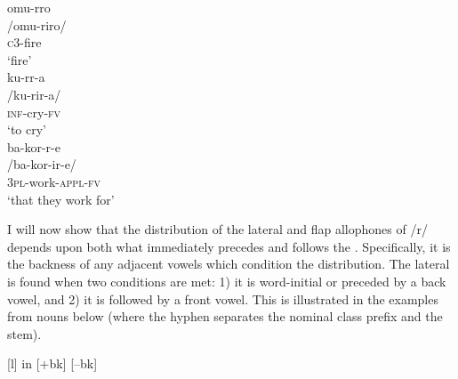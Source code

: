 \documentclass[output=paper,modfonts,nonflat,
colorlinks, citecolor=brown,
draftmode,
]{langsci/langscibook}
\begin{document}
\ea\label{ex:bickmore:1}
\ea\label{ex:bickmore:1a}
\glll omu-rro \\
/omu-riro/\\
\textsc{c3}-fire\\
\glt ‘fire’\\
\ex\label{ex:bickmore:1b}
\glll ku-rr-a \\
/ku-rir-a/\\
\textsc{inf-}\textup{cry}\textsc{{}-fv}\\
\glt  ‘to cry’\\
\ex\label{ex:bickmore:1c}
\glll ba-kor-r-e \\
/ba-kor-ir-e/\\
\textsc{3pl-}\textup{work}\textsc{{}-\textsc{appl}-fv}\\
\glt  ‘that they work for’\\
\z
\z
%
%

I will now show that the distribution of the lateral and flap allophones of /r/ depends upon both what immediately precedes and follows the . Specifically, it is the backness of any adjacent vowels which condition the distribution. The lateral is found when two conditions %
%
are met: 1) it is word-initial or preceded by a back vowel, and 2) it is followed by a front vowel. This is illustrated in the examples from nouns below (where the hyphen separates the nominal class prefix and the stem).

\ea\label{ex:bickmore:2}
[l] in  [+bk] {\longrule} [--bk]
\ea\label{ex:bickmore:2a}
\ex\label{ex:bickmore:2b}
\ex\label{ex:bickmore:2c}
\ex\label{ex:bickmore:2d}
\z
\z
\end{document}
